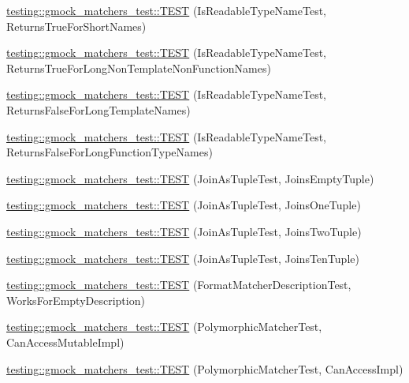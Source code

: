 \begin{DoxyCompactItemize}
\item 
\hyperlink{namespacetesting_1_1gmock__matchers__test_aef0bf5f855b1e75c63ec45408b5a23ba}{testing\+::gmock\+\_\+matchers\+\_\+test\+::\+T\+E\+ST} (Is\+Readable\+Type\+Name\+Test, Returns\+True\+For\+Short\+Names)
\item 
\hyperlink{namespacetesting_1_1gmock__matchers__test_a839515535e3e75d4f80ba6ae8f7347ec}{testing\+::gmock\+\_\+matchers\+\_\+test\+::\+T\+E\+ST} (Is\+Readable\+Type\+Name\+Test, Returns\+True\+For\+Long\+Non\+Template\+Non\+Function\+Names)
\item 
\hyperlink{namespacetesting_1_1gmock__matchers__test_ad1630d47de9f4fcdc00ab4962eaeea05}{testing\+::gmock\+\_\+matchers\+\_\+test\+::\+T\+E\+ST} (Is\+Readable\+Type\+Name\+Test, Returns\+False\+For\+Long\+Template\+Names)
\item 
\hyperlink{namespacetesting_1_1gmock__matchers__test_a30516b1c70e14132d1d87ab08b96aa2f}{testing\+::gmock\+\_\+matchers\+\_\+test\+::\+T\+E\+ST} (Is\+Readable\+Type\+Name\+Test, Returns\+False\+For\+Long\+Function\+Type\+Names)
\item 
\hyperlink{namespacetesting_1_1gmock__matchers__test_aa633c0b7e0f0316c23bff10e9963f773}{testing\+::gmock\+\_\+matchers\+\_\+test\+::\+T\+E\+ST} (Join\+As\+Tuple\+Test, Joins\+Empty\+Tuple)
\item 
\hyperlink{namespacetesting_1_1gmock__matchers__test_acaec7fcf41bb1cdf7124b443e7ab28e8}{testing\+::gmock\+\_\+matchers\+\_\+test\+::\+T\+E\+ST} (Join\+As\+Tuple\+Test, Joins\+One\+Tuple)
\item 
\hyperlink{namespacetesting_1_1gmock__matchers__test_a0831a9160c5420fcd363e4a520f0fb61}{testing\+::gmock\+\_\+matchers\+\_\+test\+::\+T\+E\+ST} (Join\+As\+Tuple\+Test, Joins\+Two\+Tuple)
\item 
\hyperlink{namespacetesting_1_1gmock__matchers__test_a56811b12ff298040a3d44dba0a2e4a8e}{testing\+::gmock\+\_\+matchers\+\_\+test\+::\+T\+E\+ST} (Join\+As\+Tuple\+Test, Joins\+Ten\+Tuple)
\item 
\hyperlink{namespacetesting_1_1gmock__matchers__test_ae104f652fab7d1b3c3873f6987401481}{testing\+::gmock\+\_\+matchers\+\_\+test\+::\+T\+E\+ST} (Format\+Matcher\+Description\+Test, Works\+For\+Empty\+Description)
\item 
\hyperlink{namespacetesting_1_1gmock__matchers__test_ae29925e94a9396fe3c7fab6efaff8d8a}{testing\+::gmock\+\_\+matchers\+\_\+test\+::\+T\+E\+ST} (Polymorphic\+Matcher\+Test, Can\+Access\+Mutable\+Impl)
\item 
\hyperlink{namespacetesting_1_1gmock__matchers__test_a918a64c4594ef6b30f53d735c2e6e6ac}{testing\+::gmock\+\_\+matchers\+\_\+test\+::\+T\+E\+ST} (Polymorphic\+Matcher\+Test, Can\+Access\+Impl)

\end{DoxyCompactItemize}
